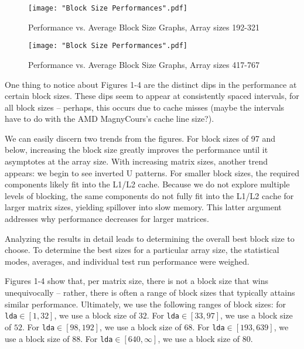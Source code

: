 \documentclass{article} %
\begin{document}
\begin{figure}
 \noindent
 \hspace*{-1.5in}
 \texttt{[image: "Block Size Performances".pdf]} %
 \caption{Performance vs. Average Block Size Graphs, Array sizes 192-321}
\end{figure}

\begin{figure}
 \noindent
 \hspace*{-1.5in}
 \texttt{[image: "Block Size Performances".pdf]} %
 \caption{Performance vs. Average Block Size Graphs, Array sizes 417-767}
\end{figure}

\clearpage
One thing to notice about Figures 1-4 are the distinct dips in the performance at
certain block sizes. These dips seem to appear at consistently spaced intervals, for
all block sizes -- perhaps, this occurs due to cache misses (maybe the intervals
have to do with the AMD MagnyCours's cache line size?).

We can easily discern two trends from the figures. For block sizes of 97 and below,
increasing the block size greatly improves the performance until it asymptotes at
the array size. With increasing matrix sizes, another trend appears: we begin
to see inverted U patterns. For smaller block sizes, the required components likely
fit into the L1/L2 cache. Because we do not explore multiple levels of blocking, the
same components do not fully fit into the L1/L2 cache for larger matrix sizes, yielding
spillover into slow memory. This latter argument addresses why performance decreases
for larger matrices.

Analyzing the results in detail leads to determining the overall best block size
to choose. To determine the best sizes for a particular array size, the
statistical modes, averages, and individual test run performance were weighed.

Figures 1-4 show that, per matrix size, there is not a block size
that wins unequivocally -- rather, there is often a range of block sizes that typically
attains similar performance. Ultimately, we use the following ranges of block sizes:
for \texttt{lda}$\in [1, 32]$, we use a block size of $32$. For \texttt{lda}$\in [33, 97]$,
we use a block size of $52$. For \texttt{lda}$\in [98, 192]$, we use a block size of $68$.
For \texttt{lda}$\in [193, 639]$, we use a block size of $88$. For \texttt{lda}$\in [640, \infty]$,
we use a block size of $80$.
\end{document}
